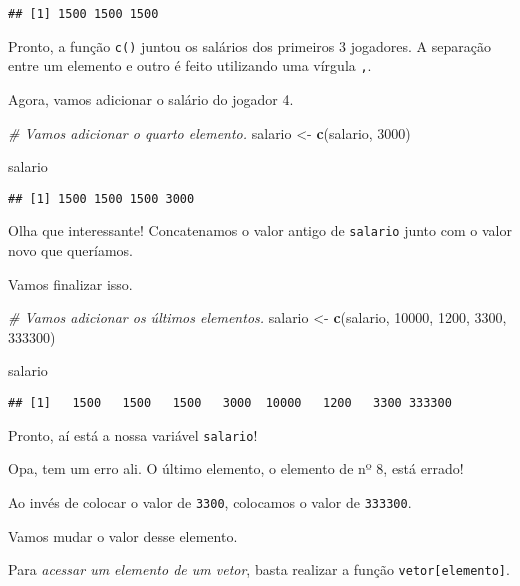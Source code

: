 \documentclass[
]{article}
\newenvironment{Shaded}{\begin{snugshade}}{\end{snugshade}}
\newcommand{\CommentTok}[1]{\textcolor[rgb]{0.56,0.35,0.01}{\textit{#1}}}
\newcommand{\DecValTok}[1]{\textcolor[rgb]{0.00,0.00,0.81}{#1}}
\newcommand{\KeywordTok}[1]{\textcolor[rgb]{0.13,0.29,0.53}{\textbf{#1}}}
\newcommand{\NormalTok}[1]{#1}
\newcommand{\StringTok}[1]{\textcolor[rgb]{0.31,0.60,0.02}{#1}}
\begin{document}
\begin{verbatim}
## [1] 1500 1500 1500
\end{verbatim}

Pronto, a função \texttt{c()} juntou os salários dos primeiros 3
jogadores. A separação entre um elemento e outro é feito utilizando uma
vírgula \texttt{,}.

Agora, vamos adicionar o salário do jogador 4.

\begin{Shaded}
\begin{Highlighting}[]
\CommentTok{# Vamos adicionar o quarto elemento.}
\NormalTok{salario <-}\StringTok{ }\KeywordTok{c}\NormalTok{(salario, }\DecValTok{3000}\NormalTok{)}

\NormalTok{salario}
\end{Highlighting}
\end{Shaded}

\begin{verbatim}
## [1] 1500 1500 1500 3000
\end{verbatim}

Olha que interessante! Concatenamos o valor antigo de \texttt{salario}
junto com o valor novo que queríamos.

Vamos finalizar isso.

\begin{Shaded}
\begin{Highlighting}[]
\CommentTok{# Vamos adicionar os últimos elementos.}
\NormalTok{salario <-}\StringTok{ }\KeywordTok{c}\NormalTok{(salario, }\DecValTok{10000}\NormalTok{, }\DecValTok{1200}\NormalTok{, }\DecValTok{3300}\NormalTok{, }\DecValTok{333300}\NormalTok{)}

\NormalTok{salario}
\end{Highlighting}
\end{Shaded}

\begin{verbatim}
## [1]   1500   1500   1500   3000  10000   1200   3300 333300
\end{verbatim}

Pronto, aí está a nossa variável \texttt{salario}!

Opa, tem um erro ali. O último elemento, o elemento de nº 8, está
errado!

Ao invés de colocar o valor de \texttt{3300}, colocamos o valor de
\texttt{333300}.

Vamos mudar o valor desse elemento.

Para \emph{acessar um elemento de um vetor}, basta realizar a função
\texttt{vetor{[}elemento{]}}.
\end{document}
